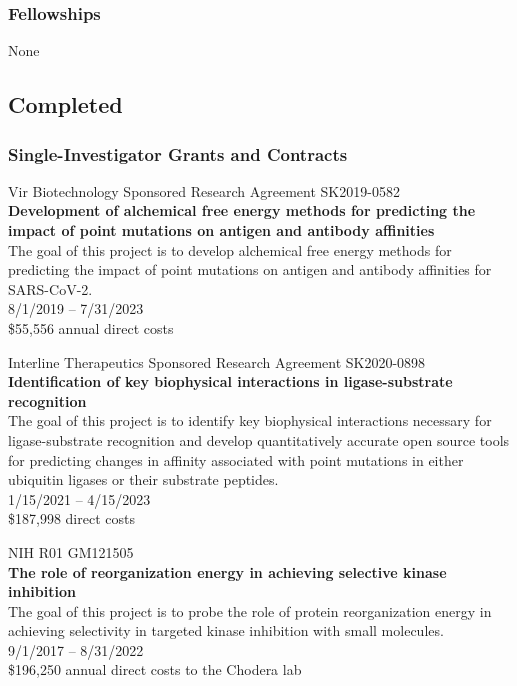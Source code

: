 \documentclass[10pt]{article}
\begin{document}
\subsubsection*{Fellowships}

None

\eject

\subsection*{Completed}

\subsubsection*{Single-Investigator Grants and Contracts}

Vir Biotechnology Sponsored Research Agreement SK2019-0582 \\
{\bf Development of alchemical free energy methods for predicting the impact of point mutations on antigen and antibody affinities}\\
The goal of this project is to develop alchemical free energy methods for predicting the impact of point mutations on antigen and antibody affinities for SARS-CoV-2.\\
8/1/2019 -- 7/31/2023\\
\$55,556 annual direct costs

\vspace{1.5ex}

Interline Therapeutics Sponsored Research Agreement SK2020-0898 \\
{\bf Identification of key biophysical interactions in ligase-substrate recognition} \\
The goal of this project is to identify key biophysical interactions necessary for ligase-substrate recognition and develop quantitatively accurate open source tools for predicting changes in affinity associated with point mutations in either ubiquitin ligases or their substrate peptides. \\
1/15/2021 -- 4/15/2023\\
\$187,998 direct costs

\vspace{1.5ex}

NIH R01 GM121505 \\
{\bf The role of reorganization energy in achieving selective kinase inhibition} \\
The goal of this project is to probe the role of protein reorganization energy in achieving selectivity in targeted kinase inhibition with small molecules. \\
9/1/2017 -- 8/31/2022 \\
\$196,250 annual direct costs to the Chodera lab
\end{document}
